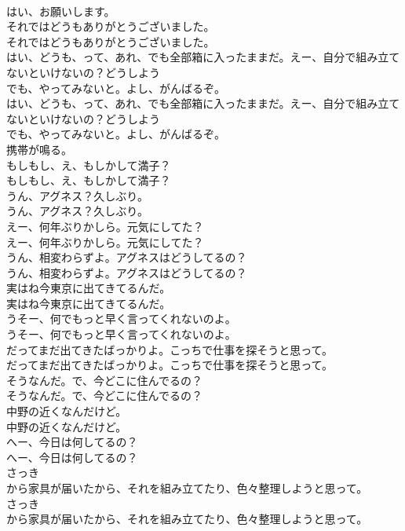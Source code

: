 \documentclass[8pt]{extreport}
\begin{document}
\begin{CJK}{UTF8}{min}
\\	はい、お願いします。 
\\	それではどうもありがとうございました。	
\\	それではどうもありがとうございました。 
\\	はい、どうも、って、あれ、でも全部箱に入ったままだ。えー、自分で組み立てないといけないの？どうしよう
\\	でも、やってみないと。よし、がんばるぞ。	
\\	はい、どうも、って、あれ、でも全部箱に入ったままだ。えー、自分で組み立てないといけないの？どうしよう
\\	でも、やってみないと。よし、がんばるぞ。 
\\	携帯が鳴る。	
\\	もしもし、え、もしかして満子？	
\\	もしもし、え、もしかして満子？ 
\\	うん、アグネス？久しぶり。	
\\	うん、アグネス？久しぶり。 
\\	えー、何年ぶりかしら。元気にしてた？	
\\	えー、何年ぶりかしら。元気にしてた？ 
\\	うん、相変わらずよ。アグネスはどうしてるの？	
\\	うん、相変わらずよ。アグネスはどうしてるの？ 
\\	実はね今東京に出てきてるんだ。	
\\	実はね今東京に出てきてるんだ。 
\\	うそー、何でもっと早く言ってくれないのよ。	
\\	うそー、何でもっと早く言ってくれないのよ。 
\\	だってまだ出てきたばっかりよ。こっちで仕事を探そうと思って。	
\\	だってまだ出てきたばっかりよ。こっちで仕事を探そうと思って。 
\\	そうなんだ。で、今どこに住んでるの？	
\\	そうなんだ。で、今どこに住んでるの？ 
\\	中野の近くなんだけど。	
\\	中野の近くなんだけど。 
\\	へー、今日は何してるの？	
\\	へー、今日は何してるの？ 
\\	さっき
\\	から家具が届いたから、それを組み立てたり、色々整理しようと思って。	
\\	さっき
\\	から家具が届いたから、それを組み立てたり、色々整理しようと思って。 

\end{CJK}
\end{document}
